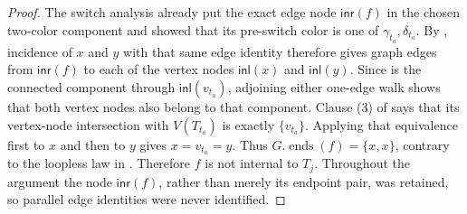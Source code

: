 \begin{proof}
The switch analysis already put the exact edge node
\(\mathsf{inr}(f)\) in the chosen two-color component and showed that
its pre-switch color is one of
\(\gamma_{t_a},\delta_{t_a}\).  By
, incidence of \(x\) and \(y\) with
that same edge identity therefore gives graph edges from
\(\mathsf{inr}(f)\) to each of the vertex nodes
\(\mathsf{inl}(x)\) and \(\mathsf{inl}(y)\).  Since
 is the connected component through
\(\mathsf{inl}(v_{t_a})\), adjoining either one-edge walk shows that
both vertex nodes also belong to that component.  Clause (3) of
 says that its vertex-node
intersection with \(V(T_{t_a})\) is exactly
\(\{v_{t_a}\}\).  Applying that equivalence first to \(x\) and then to
\(y\) gives \(x=v_{t_a}=y\).  Thus
\(G.\operatorname{ends}(f)=\{x,x\}\), contrary to the loopless law in
.  Therefore \(f\) is not internal to
\(T_j\).  Throughout the argument the node \(\mathsf{inr}(f)\), rather
than merely its endpoint pair, was retained, so parallel edge identities
were never identified.
\end{proof}
